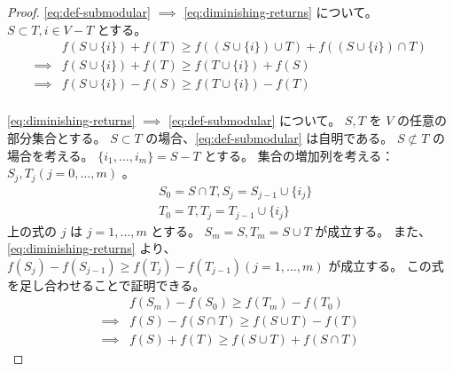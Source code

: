 \documentclass{classes/report}
\begin{document}
\begin{proof}
    \ref{eq:def-submodular} $\implies$ \ref{eq:diminishing-returns} について。
    $S \subset T, i \in V - T$ とする。
    \begin{align*}
        &f(S \cup \{i\}) + f(T) \ge f((S \cup \{i\}) \cup T) + f((S \cup \{i\}) \cap T) \\
        \implies &f(S \cup \{i\}) + f(T) \ge f(T \cup \{i\}) + f(S) \\
        \implies &f(S \cup \{i\}) - f(S) \ge f(T \cup \{i\}) - f(T) \\
    \end{align*}

    \ref{eq:diminishing-returns} $\implies$ \ref{eq:def-submodular} について。
    $S, T$ を $V$ の任意の部分集合とする。
    $S \subset T$ の場合、\ref{eq:def-submodular} は自明である。
    $S \not \subset T$ の場合を考える。
    $\{i_1, \dots, i_m\} = S - T$ とする。
    集合の増加列を考える：$S_j, T_j (j=0, \dots, m)$ 。
    \begin{align*}
        &S_0 = S \cap T , S_j = S_{j-1} \cup \{i_j\} \\
        &T_0 = T        , T_j = T_{j-1} \cup \{i_j\}
    \end{align*}
    上の式の $j$ は $j=1, \dots, m$ とする。
    $S_m = S, T_m = S \cup T$ が成立する。
    また、 \ref{eq:diminishing-returns} より、$f(S_j) - f(S_{j-1}) \ge f(T_j) - f(T_{j-1})  (j=1, \dots, m)$ が成立する。
    この式を足し合わせることで証明できる。
    \begin{align*}
        &f(S_m) - f(S_0) \ge f(T_m) - f(T_0) \\
        \implies &f(S) - f(S \cap T) \ge f(S \cup T) - f(T) \\
        \implies &f(S) + f(T) \ge f(S \cup T) + f(S \cap T)
    \end{align*}
\end{proof}

\begin{tcolorbox}
    \begin{eg}[カバー関数]
    \end{eg}
    \begin{eg}[グラフのカット関数]
    \end{eg}
    \begin{eg}[凹関数が生成する関数]
    \end{eg}
    \begin{eg}
    \end{eg}
    \begin{eg}
    \end{eg}
\end{tcolorbox}
\end{document}
